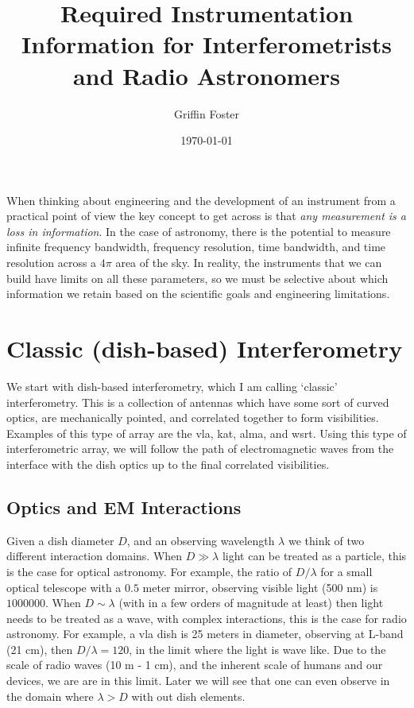 \documentclass[usenatbib,usegraphicx]{article}
\begin{document}
\title{Required Instrumentation Information for Interferometrists and Radio Astronomers}
\author{Griffin Foster}
\date{\today}
\maketitle

\label{firstpage}

When thinking about engineering and the development of an instrument from a practical point of view the key concept to get across is that \emph{any measurement is a loss in information}.
In the case of astronomy, there is the potential to measure infinite frequency bandwidth, frequency resolution, time bandwidth, and time resolution across a $4\pi$ area of the sky.
In reality, the instruments that we can build have limits on all these parameters, so we must be selective about which information we retain based on the scientific goals and engineering limitations.

\section{Classic (dish-based) Interferometry}

We start with dish-based interferometry, which I am calling `classic' interferometry.
This is a collection of antennas which have some sort of curved optics, are mechanically pointed, and correlated together to form visibilities.
Examples of this type of array are the \gls{vla}, \gls{kat}, \gls{alma}, and \gls{wsrt}.
Using this type of interferometric array, we will follow the path of electromagnetic waves from the interface with the dish optics up to the final correlated visibilities.

\subsection{Optics and EM Interactions}

Given a dish diameter $D$, and an observing wavelength $\lambda$ we think of two different interaction domains.
When $D \gg \lambda$ light can be treated as a particle, this is the case for optical astronomy.
For example, the ratio of $D/\lambda$ for a small optical telescope with a $0.5$ meter mirror, observing visible light (500 nm) is $1000000$.
When $D \sim \lambda$ (with in a few orders of magnitude at least) then light needs to be treated as a wave, with complex interactions, this is the case for radio astronomy.
For example, a \gls{vla} dish is 25 meters in diameter, observing at L-band (21 cm), then $D/\lambda = 120$, in the limit where the light is wave like.
Due to the scale of radio waves (10 m - 1 cm), and the inherent scale of humans and our devices, we are are in this limit.
Later we will see that one can even observe in the domain where $\lambda > D$ with out dish elements.
\end{document}
